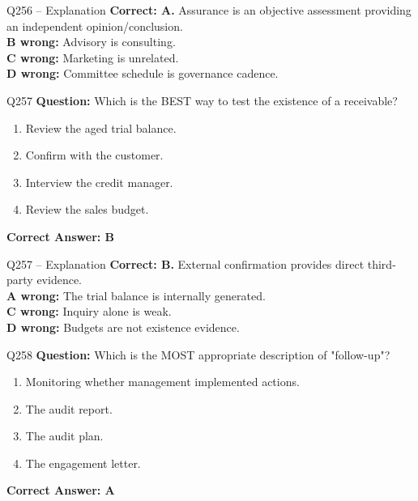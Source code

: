 \documentclass[aspectratio=169,10pt]{beamer}
\begin{document}
	\begin{frame}[t]{Q256 -- Explanation}
		\small
		\textbf{Correct: A.} Assurance is an objective assessment providing an independent opinion/conclusion. \\[4pt]
		\textbf{B wrong:} Advisory is consulting. \\[2pt]
		\textbf{C wrong:} Marketing is unrelated. \\[2pt]
		\textbf{D wrong:} Committee schedule is governance cadence.
	\end{frame}
	
	\begin{frame}[t]{Q257}
		\small
		\textbf{Question:} Which is the BEST way to test the existence of a receivable?
		\begin{enumerate}[label=\Alph*.,itemsep=1pt,topsep=2pt]
			\item Review the aged trial balance.
			\item Confirm with the customer.
			\item Interview the credit manager.
			\item Review the sales budget.
		\end{enumerate}
		\vspace{4pt}
		\textbf{Correct Answer: B}
	\end{frame}
	
	\begin{frame}[t]{Q257 -- Explanation}
		\small
		\textbf{Correct: B.} External confirmation provides direct third-party evidence. \\[4pt]
		\textbf{A wrong:} The trial balance is internally generated. \\[2pt]
		\textbf{C wrong:} Inquiry alone is weak. \\[2pt]
		\textbf{D wrong:} Budgets are not existence evidence.
	\end{frame}
	
	\begin{frame}[t]{Q258}
		\small
		\textbf{Question:} Which is the MOST appropriate description of "follow-up"?
		\begin{enumerate}[label=\Alph*.,itemsep=1pt,topsep=2pt]
			\item Monitoring whether management implemented actions.
			\item The audit report.
			\item The audit plan.
			\item The engagement letter.
		\end{enumerate}
		\vspace{4pt}
		\textbf{Correct Answer: A}
	\end{frame}
	
\end{document}
